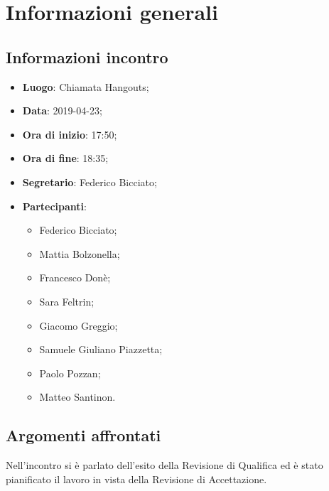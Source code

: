 \section{Informazioni generali}

\subsection{Informazioni incontro}
\begin{itemize}
\item \textbf{Luogo}: Chiamata Hangouts;
\item \textbf{Data}: 2019-04-23;
\item \textbf{Ora di inizio}: 17:50;
\item \textbf{Ora di fine}: 18:35;
\item \textbf{Segretario}: Federico Bicciato;
\item \textbf{Partecipanti}: 
\begin{itemize}
	\item Federico Bicciato;
	\item Mattia Bolzonella;
	\item Francesco Donè;
	\item Sara Feltrin;
	\item Giacomo Greggio;
	\item Samuele Giuliano Piazzetta;
	\item Paolo Pozzan;
	\item Matteo Santinon.
\end{itemize}
\end{itemize}

\subsection{Argomenti affrontati}
Nell'incontro si è parlato dell'esito della Revisione di 
Qualifica ed è stato pianificato il lavoro in vista della Revisione di 
Accettazione.
